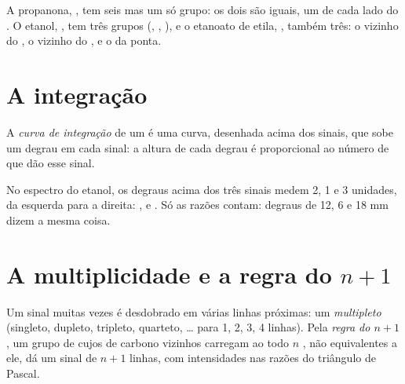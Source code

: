 \begin{example}\label{ex:g12:proton-nmr:groups}
A propanona, , tem seis  mas um só grupo: os dois
 são iguais, um de cada lado do . O etanol,
, tem três grupos (, , ), e o
etanoato de etila, , também três: o 
vizinho do , o  vizinho do , e o  da
ponta.
\end{example}

\section{A integração}

\begin{definition}\label{def:g12:proton-nmr:integration}
A \emph{curva de integração} de um  é uma curva, desenhada acima dos sinais, que sobe um degrau em
cada sinal: a altura de cada degrau é proporcional ao número de 
que dão esse sinal.
\end{definition}

\begin{example}\label{ex:g12:proton-nmr:steps}
No espectro do etanol, os degraus acima dos três sinais medem 2, 1 e 3
unidades, da esquerda para a direita: ,  e . Só
as razões contam: degraus de 12, 6 e 18 mm dizem a mesma coisa.
\end{example}

\section{A multiplicidade e a regra do \texorpdfstring{$n+1$}{n+1}}


\begin{definition}\label{def:g12:proton-nmr:multiplet}
Um sinal muitas vezes é desdobrado em várias linhas próximas: um
\emph{multipleto} (singleto, dupleto, tripleto,
quarteto, \dots{} para 1, 2, 3, 4 linhas). Pela \emph{regra do
$n+1$}, um grupo de  cujos  de carbono vizinhos carregam ao todo $n$
, não equivalentes a ele, dá um sinal de $n+1$ linhas, com
intensidades nas razões do triângulo de Pascal.
\end{definition}

